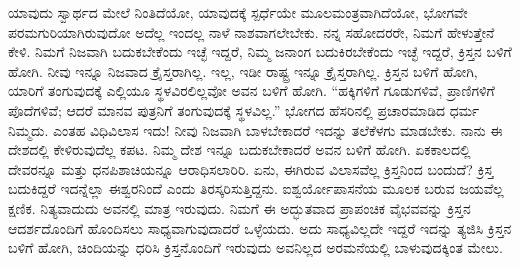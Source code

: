 ಯಾವುದು ಸ್ವಾರ್ಥದ ಮೇಲೆ ನಿಂತಿದೆಯೋ, ಯಾವುದಕ್ಕೆ ಸ್ಪರ್ಧೆಯೇ ಮೂಲಮಂತ್ರವಾಗಿದೆಯೋ, ಭೋಗವೇ ಪರಮಗುರಿಯಾಗಿರುವುದೋ ಅದೆಲ್ಲ ಇಂದಲ್ಲ ನಾಳೆ ನಾಶವಾಗಲೇಬೇಕು. ನನ್ನ ಸಹೋದರರೇ, ನಿಮಗೆ ಹೇಳುತ್ತೇನೆ ಕೇಳಿ. ನಿಮಗೆ ನಿಜವಾಗಿ ಬದುಕಬೇಕೆಂದು ಇಚ್ಛೆ ಇದ್ದರೆ, ನಿಮ್ಮ ಜನಾಂಗ ಬದುಕಿರಬೇಕೆಂದು ಇಚ್ಛೆ ಇದ್ದರೆ, ಕ್ರಿಸ್ತನ ಬಳಿಗೆ ಹೋಗಿ. ನೀವು ಇನ್ನೂ ನಿಜವಾದ ಕ್ರೈಸ್ತರಾಗಿಲ್ಲ. ಇಲ್ಲ, ಇಡೀ ರಾಷ್ಟ್ರ ಇನ್ನೂ ಕ್ರೈಸ್ತರಾಗಿಲ್ಲ. ಕ್ರಿಸ್ತನ ಬಳಿಗೆ ಹೋಗಿ, ಯಾರಿಗೆ ತಂಗುವುದಕ್ಕೆ ಎಲ್ಲಿಯೂ ಸ್ಥಳವಿರಲಿಲ್ಲವೋ ಅವನ ಬಳಿಗೆ ಹೋಗಿ. “ಹಕ್ಕಿಗಳಿಗೆ ಗೂಡುಗಳಿವೆ, ಪ್ರಾಣಿಗಳಿಗೆ ಪೊದೆಗಳಿವೆ; ಆದರೆ ಮಾನವ ಪುತ್ರನಿಗೆ ತಂಗುವುದಕ್ಕೆ ಸ್ಥಳವಿಲ್ಲ.” ಭೋಗದ ಹೆಸರಿನಲ್ಲಿ ಪ್ರಚಾರಮಾಡಿದ ಧರ್ಮ ನಿಮ್ಮದು. ಎಂತಹ ವಿಧಿವಿಲಾಸ ಇದು! ನೀವು ನಿಜವಾಗಿ ಬಾಳಬೇಕಾದರೆ ಇದನ್ನು ತಲೆಕೆಳಗು ಮಾಡಬೇಕು. ನಾನು ಈ ದೇಶದಲ್ಲಿ ಕೇಳಿರುವುದೆಲ್ಲ ಕಪಟ. ನಿಮ್ಮ ದೇಶ ಇನ್ನೂ ಬದುಕಬೇಕಾದರೆ ಅವನ ಬಳಿಗೆ ಹೋಗಿ. ಏಕಕಾಲದಲ್ಲಿ ದೇವರನ್ನೂ ಮತ್ತು ಧನಪಿಶಾಚಿಯನ್ನೂ ಆರಾಧಿಸಲಾರಿರಿ. ಏನು, ಈಗಿರುವ ವಿಲಾಸವೆಲ್ಲ ಕ್ರಿಸ್ತನಿಂದ ಬಂದುದೆ? ಕ್ರಿಸ್ತ ಬದುಕಿದ್ದರೆ ಇದನ್ನೆಲ್ಲಾ ಈಶ್ವರನಿಂದೆ ಎಂದು ತಿರಸ್ಕರಿಸುತ್ತಿದ್ದನು. ಐಶ್ವರ್ಯೋಪಾಸನೆಯ ಮೂಲಕ ಬರುವ ಜಯವೆಲ್ಲ ಕ್ಷಣಿಕ. ನಿತ್ಯವಾದುದು ಅವನಲ್ಲಿ ಮಾತ್ರ ಇರುವುದು. ನಿಮಗೆ ಈ ಅದ್ಭುತವಾದ ಪ್ರಾಪಂಚಿಕ ವೈಭವವನ್ನು ಕ್ರಿಸ್ತನ ಆದರ್ಶದೊಂದಿಗೆ ಹೊಂದಿಸಲು ಸಾಧ್ಯವಾಗುವುದಾದರೆ ಒಳ್ಳೆಯದು. ಅದು ಸಾಧ್ಯವಿಲ್ಲದೇ ಇದ್ದರೆ ಇದನ್ನು ತ್ಯಜಿಸಿ ಕ್ರಿಸ್ತನ ಬಳಿಗೆ ಹೋಗಿ, ಚಿಂದಿಯನ್ನು ಧರಿಸಿ ಕ್ರಿಸ್ತನೊಂದಿಗೆ ಇರುವುದು ಅವನಿಲ್ಲದ ಅರಮನೆಯಲ್ಲಿ ಬಾಳುವುದಕ್ಕಿಂತ ಮೇಲು.

